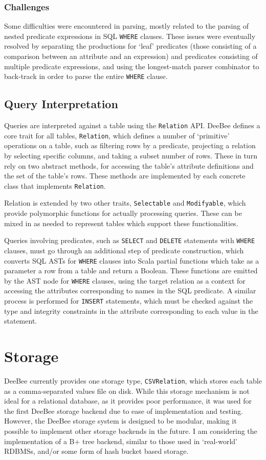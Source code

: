 \subsubsection{Challenges}
Some difficulties were encountered in parsing, mostly related to the parsing of nested predicate expressions in SQL \texttt{WHERE} clauses. These issues were eventually resolved by separating the productions for `leaf' predicates (those consisting of a comparison between an attribute and an expression) and predicates consisting of multiple predicate expressions, and using the longest-match parser combinator to back-track in order to parse the entire \texttt{WHERE} clause.

\subsection{Query Interpretation}
\label{sec:query}
Queries are interpreted against a table using the \texttt{Relation} API. DeeBee defines a core trait for all tables, \texttt{Relation}, which defines a number of `primitive' operations on a table, such as filtering rows by a predicate, projecting a relation by selecting specific columns, and taking a subset number of rows. These in turn rely on two abstract methods, for accessing the table's attribute definitions and the set of the table's rows. These methods are implemented by each concrete class that implements \texttt{Relation}.

Relation is extended by two other traits, \texttt{Selectable} and \texttt{Modifyable}, which provide polymorphic functions for actually processing queries. These can be mixed in as needed to represent tables which support these functionalities.

Queries involving predicates, such as \texttt{SELECT} and \texttt{DELETE} statements with \texttt{WHERE} clauses, must go through an additional step of predicate construction, which converts SQL ASTs for \texttt{WHERE} clauses into Scala partial functions which take as a parameter a row from a table and return a Boolean. These functions are emitted by the AST node for \texttt{WHERE} clauses, using the target relation as a context for accessing the attributes corresponding to names in the SQL predicate. A similar process is performed for \texttt{INSERT} statements, which must be checked against the type and integrity constraints in the attribute corresponding to each value in the statement.

\section{Storage}
\label{sec:storage}
DeeBee currently provides one storage type, \texttt{CSVRelation}, which stores each table as a comma-separated values file on disk. While this storage mechanism is not ideal for a relational database, as it provides poor performance, it was used for the first DeeBee storage backend due to ease of implementation and testing. However, the DeeBee storage system is designed to be modular, making it possible to implement other storage backends in the future. I am considering the implementation of a B+ tree backend, similar to those used in `real-world' RDBMSs, and/or some form of hash bucket based storage.

